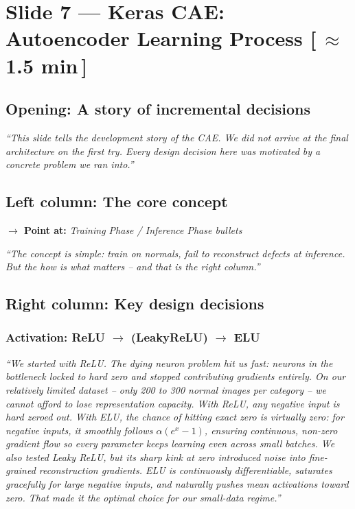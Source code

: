 \documentclass[12pt, a4paper]{article}
\newcommand{\say}[1]{%
  \begin{mdframed}[style=saybox]
  \itshape ``#1''
  \end{mdframed}
}
\newcommand{\timing}[1]{\hfill{\small\color{muted}[\,\textbf{#1}\,]}}
\newcommand{\pointer}[1]{\noindent\textbf{\color{teal}$\rightarrow$ Point at:} \textit{#1}\\[2pt]}
\begin{document}
\section{Slide 7 --- Keras CAE: Autoencoder Learning Process \timing{$\approx$1.5 min}}

\subsection{Opening: A story of incremental decisions}

\say{This slide tells the development story of the CAE. We did not arrive at the final architecture on the first try. Every design decision here was motivated by a concrete problem we ran into.}

\subsection{Left column: The core concept}

\pointer{Training Phase / Inference Phase bullets}

\say{The concept is simple: train on normals, fail to reconstruct defects at inference. But the \textit{how} is what matters -- and that is the right column.}

\subsection{Right column: Key design decisions}

\subsubsection{Activation: ReLU $\to$ (LeakyReLU) $\to$ ELU}

\say{We started with ReLU. The dying neuron problem hit us fast: neurons in the bottleneck locked to hard zero and stopped contributing gradients entirely. On our relatively limited dataset -- only 200 to 300 normal images per category -- we cannot afford to lose representation capacity. With ReLU, any negative input is hard zeroed out. With ELU, the chance of hitting exact zero is virtually zero: for negative inputs, it smoothly follows $\alpha(e^x - 1)$, ensuring continuous, non-zero gradient flow so every parameter keeps learning even across small batches. We also tested Leaky ReLU, but its sharp kink at zero introduced noise into fine-grained reconstruction gradients. ELU is continuously differentiable, saturates gracefully for large negative inputs, and naturally pushes mean activations toward zero. That made it the optimal choice for our small-data regime.}
\end{document}
